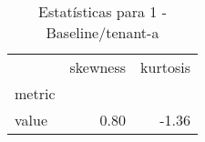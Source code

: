 \begin{table}[htbp]
\caption{Estatísticas para 1 - Baseline/tenant-a}
\label{tab:1_-_baseline_tenant-a_skewkurt}
\begin{tabular}{lrr}
\toprule
 & skewness & kurtosis \\
metric &  &  \\
\midrule
value & 0.80 & -1.36 \\
\bottomrule
\end{tabular}
\end{table}
